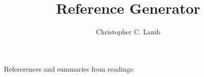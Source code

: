 \documentclass[10pt,letterpaper]{article}
\author{Christopher C. Lamb}
\title{Reference Generator}
\begin{document}
Refererences and summaries from readings:





\end{document}
